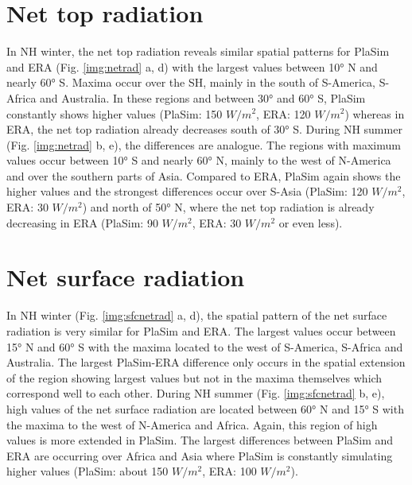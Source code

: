 \documentclass[12pt,a4paper,twoside,openright,headinclude,liststotoc,bibtotoc]{scrreprt}
\begin{document}
\vspace{-0.4cm}
\section{Net top radiation}
\vspace{-0.4cm}

In NH winter, the net top radiation reveals similar spatial patterns for PlaSim and ERA (Fig. \ref{img:netrad} a, d) with the largest values between 10° N and nearly 60° S. Maxima occur over the SH, mainly in the south of S-America, S-Africa and Australia. In these regions and between 30° and 60° S, PlaSim constantly shows higher values (PlaSim: 150 $W/m^2$, ERA: 120 $W/m^2$) whereas in ERA, the net top radiation already decreases south of 30° S. During NH summer (Fig. \ref{img:netrad} b, e), the differences are analogue. The regions with maximum values occur between 10° S and nearly 60° N, mainly to the west of N-America and over the southern parts of Asia. Compared to ERA, PlaSim again shows the higher values and the strongest differences occur over S-Asia (PlaSim: 120 $W/m^2$, ERA: 30 $W/m^2$) and north of 50° N, where the net top radiation is already decreasing in ERA (PlaSim: 90 $W/m^2$, ERA: 30 $W/m^2$ or even less).


\vspace{-0.4cm}
\section{Net surface radiation}
\vspace{-0.4cm}

In NH winter (Fig. \ref{img:sfcnetrad} a, d), the spatial pattern of the net surface radiation is very similar for PlaSim and ERA. The largest values occur between 15° N and 60° S with the maxima located to the west of S-America, S-Africa and Australia. The largest PlaSim-ERA difference only occurs in the spatial extension of the region showing largest values but not in the maxima themselves which correspond well to each other. During NH summer (Fig. \ref{img:sfcnetrad} b, e), high values of the net surface radiation are located between 60° N and 15° S with the maxima to the west of N-America and Africa. Again, this region of high values is more extended in PlaSim. The largest differences between PlaSim and ERA are occurring over Africa and Asia where PlaSim is constantly simulating higher values (PlaSim: about 150 $W/m^2$, ERA: 100 $W/m^2$). 
\end{document}
